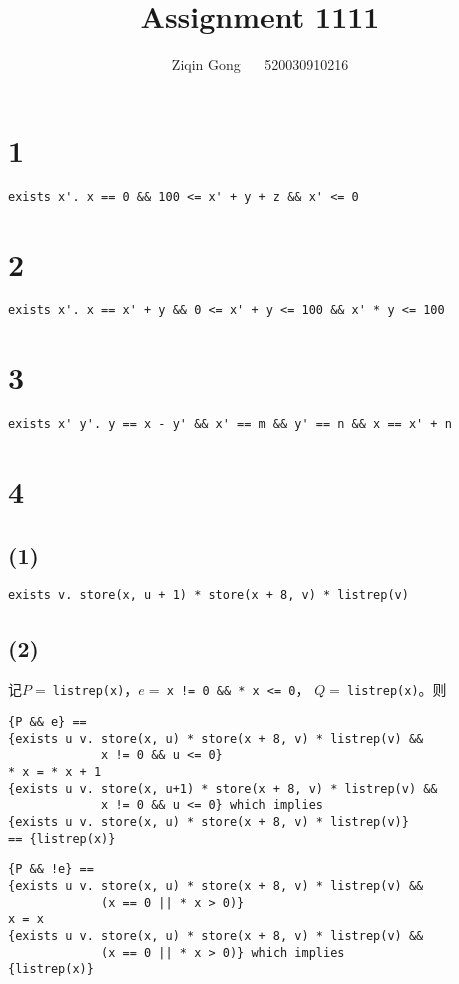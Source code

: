 \documentclass[11pt]{article}
\title{Assignment 1111}
\author{Ziqin Gong $\quad$ 520030910216}
\date{}
\begin{document}
  \maketitle

  \section*{1}

    \begin{lstlisting}
exists x'. x == 0 && 100 <= x' + y + z && x' <= 0
    \end{lstlisting}

  \section*{2}

    \begin{lstlisting}
exists x'. x == x' + y && 0 <= x' + y <= 100 && x' * y <= 100
    \end{lstlisting}

  \section*{3}

    \begin{lstlisting}
exists x' y'. y == x - y' && x' == m && y' == n && x == x' + n
    \end{lstlisting}

  \section*{4}

    \subsection*{(1)}

      \begin{lstlisting}
exists v. store(x, u + 1) * store(x + 8, v) * listrep(v)
      \end{lstlisting}

    \subsection*{(2)}

      记$P=\ $\texttt{listrep(x)}，$e=\ $\texttt{x != 0 \&\& * x <= 0}，
      $Q=\ $\texttt{listrep(x)}。则
      \begin{lstlisting}
{P && e} ==
{exists u v. store(x, u) * store(x + 8, v) * listrep(v) &&
             x != 0 && u <= 0}
* x = * x + 1
{exists u v. store(x, u+1) * store(x + 8, v) * listrep(v) &&
             x != 0 && u <= 0} which implies
{exists u v. store(x, u) * store(x + 8, v) * listrep(v)}
== {listrep(x)}
      \end{lstlisting}
      \begin{lstlisting}
{P && !e} ==
{exists u v. store(x, u) * store(x + 8, v) * listrep(v) &&
             (x == 0 || * x > 0)}
x = x
{exists u v. store(x, u) * store(x + 8, v) * listrep(v) &&
             (x == 0 || * x > 0)} which implies
{listrep(x)}
      \end{lstlisting}
\end{document}
